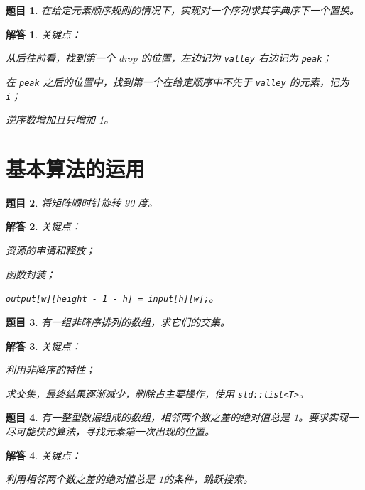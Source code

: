 \documentclass[UTF8, final]{ctexart}
\newtheorem{question}{题目}
\newtheorem{solution}{解答}
\begin{document}
\begin{question}
在给定元素顺序规则的情况下，实现对一个序列求其字典序下一个置换。
\end{question}
\begin{solution}
关键点：
\begin{compactitem}
    \item 从后往前看，找到第一个 drop 的位置，左边记为 \lstinline[style = lcpp]|valley| 右边记为 \lstinline[style = lcpp]|peak|；
    \item 在 \lstinline[style = lcpp]|peak| 之后的位置中，找到第一个在给定顺序中不先于 \lstinline[style = lcpp]|valley| 的元素，记为 \lstinline[style = lcpp]|i|；
    \item 逆序数增加且只增加 1。
\end{compactitem}

\end{solution}

\section{基本算法的运用}
\begin{question}
将矩阵顺时针旋转 90 度。
\end{question}
\begin{solution}
关键点：
\begin{compactitem}
    \item 资源的申请和释放；
    \item 函数封装；
    \item \lstinline[style = lcpp]|output[w][height - 1 - h] = input[h][w];|。
\end{compactitem}

\end{solution}

\begin{question}
有一组非降序排列的数组，求它们的交集。
\end{question}
\begin{solution}
关键点：
\begin{compactitem}
    \item 利用非降序的特性；
    \item 求交集，最终结果逐渐减少，删除占主要操作，使用 \lstinline[style = lcpp]|std::list<T>|。
\end{compactitem}

\end{solution}

\begin{question}
有一整型数据组成的数组，相邻两个数之差的绝对值总是 1。要求实现一尽可能快的算法，寻找元素第一次出现的位置。
\end{question}
\begin{solution}
关键点：
\begin{compactitem}
    \item 利用\emph{相邻两个数之差的绝对值总是 1}的条件，跳跃搜索。
\end{compactitem}

\end{solution}
\end{document}
